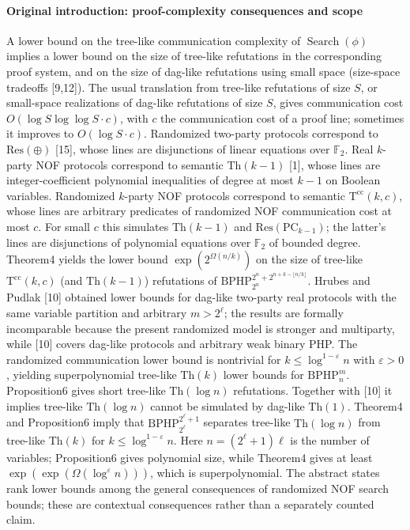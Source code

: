 \documentclass[10pt,a4paper]{article}
\begin{document}
\paragraph{Original introduction: proof-complexity consequences and scope}
A lower bound on the tree-like communication complexity of $\operatorname{Search}(\phi)$ implies a lower bound on the size of tree-like refutations in the corresponding proof system, and on the size of dag-like refutations using small space (size-space tradeoffs [9,12]). The usual translation from tree-like refutations of size $S$, or small-space realizations of dag-like refutations of size $S$, gives communication cost $O(\log S\log\log S\cdot c)$, with $c$ the communication cost of a proof line; sometimes it improves to $O(\log S\cdot c)$.
Randomized two-party protocols correspond to $\mathrm{Res}(\oplus)$ [15], whose lines are disjunctions of linear equations over $\mathbb F_2$. Real $k$-party NOF protocols correspond to semantic $\mathrm{Th}(k-1)$ [1], whose lines are integer-coefficient polynomial inequalities of degree at most $k-1$ on Boolean variables. Randomized $k$-party NOF protocols correspond to semantic $\mathrm T^{\mathrm{cc}}(k,c)$, whose lines are arbitrary predicates of randomized NOF communication cost at most $c$. For small $c$ this simulates $\mathrm{Th}(k-1)$ and $\mathrm{Res}(\mathrm{PC}_{k-1})$; the latter's lines are disjunctions of polynomial equations over $\mathbb F_2$ of bounded degree.
Theorem4 yields the lower bound $\exp(2^{\Omega(n/k)})$ on the size of tree-like $\mathrm T^{\mathrm{cc}}(k,c)$ (and $\mathrm{Th}(k-1)$) refutations of $\mathrm{BPHP}_{2^n}^{2^n+2^{n+k-\lfloor n/k\rfloor}}$.
Hrubes and Pudlak [10] obtained lower bounds for dag-like two-party real protocols with the same variable partition and arbitrary $m>2^\ell$; the results are formally incomparable because the present randomized model is stronger and multiparty, while [10] covers dag-like protocols and arbitrary weak binary PHP.
The randomized communication lower bound is nontrivial for $k\le\log^{1-\varepsilon}n$ with $\varepsilon>0$, yielding superpolynomial tree-like $\mathrm{Th}(k)$ lower bounds for $\mathrm{BPHP}_n^m$. Proposition6 gives short tree-like $\mathrm{Th}(\log n)$ refutations. Together with [10] it implies tree-like $\mathrm{Th}(\log n)$ cannot be simulated by dag-like $\mathrm{Th}(1)$.
Theorem4 and Proposition6 imply that $\mathrm{BPHP}_{2^\ell}^{2^\ell+1}$ separates tree-like $\mathrm{Th}(\log n)$ from tree-like $\mathrm{Th}(k)$ for $k\le\log^{1-\varepsilon}n$. Here $n=(2^\ell+1)\ell$ is the number of variables; Proposition6 gives polynomial size, while Theorem4 gives at least $\exp(\exp(\Omega(\log^\varepsilon n)))$, which is superpolynomial.
The abstract states rank lower bounds among the general consequences of randomized NOF search bounds; these are contextual consequences rather than a separately counted claim.
\end{document}
